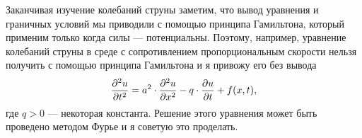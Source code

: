\documentclass[12pt,a4paper,openany,fleqn]{book}
\newcommand{\pder}[2]{\ensuremath{\frac{\partial#1}{\partial#2}}}
\newcommand{\pdder}[2]{\ensuremath{\frac{\partial^2#1}{\partial#2^2}}}
\theoremstyle{definition}
\begin{document}
Заканчивая изучение колебаний струны заметим, что вывод уравнения и граничных условий мы приводили с помощью принципа Гамильтона, который применим только когда силы --- потенциальны. Поэтому, например, уравнение колебаний струны в среде с сопротивлением пропорциональным скорости нельзя получить с помощью принципа Гамильтона и я привожу его без вывода
\begin{equation*}
	\hfill\pdder{u}{t}=a^2\cdot\pdder{u}{x}-q\cdot\pder{u}{t}+f(x,t),\hfill
\end{equation*} 
где $q>0$ --- некоторая константа. Решение этого уравнения может быть проведено методом Фурье и я советую это проделать.
\end{document}
